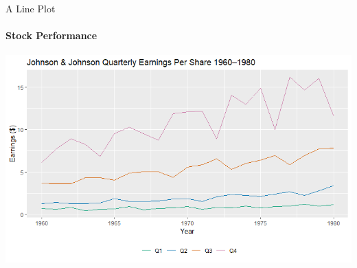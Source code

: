 \documentclass[10pt]{beamer}
\begin{document}
\begin{frame}{A Line Plot}
    \framesubtitle{Stock Performance}
    \begin{minipage}{\textwidth}
        \centering
        \includegraphics[scale=0.55]{lineplot.png}
    \end{minipage} 
\end{frame}
\end{document}
